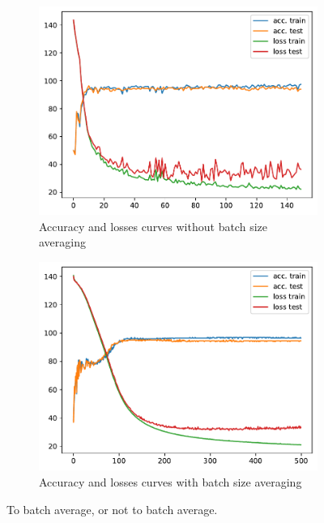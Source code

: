 \begin{figure}[H]
    \centering
    \begin{subfigure}{0.45\textwidth}
        \centering
        \includegraphics[width=\textwidth]{figs/NN/manual_acc_loss.pdf}
        \caption{Accuracy and losses curves without batch size averaging}
        \label{subfig:manual_acc_loss}
    \end{subfigure}
    \begin{subfigure}{0.45\textwidth}
        \centering
        \includegraphics[width=\textwidth]{figs/NN/manual_acc_loss_bis.pdf}
        \caption{Accuracy and losses curves with batch size averaging}
        \label{subfig:manual_acc_loss_bis}
    \end{subfigure}
    \caption{To batch average, or not to batch average.}
    \label{fig:manual_nn}
\end{figure}

